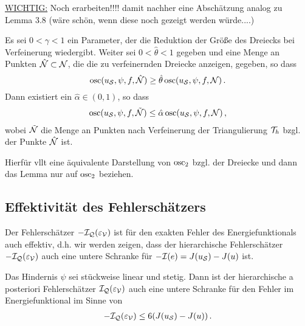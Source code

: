 \underline{WICHTIG:} Noch erarbeiten!!!! damit nachher eine Abschätzung analog zu \cite{MorNoc} Lemma 3.8 (wäre schön, wenn diese noch gezeigt werden würde....)


\begin{lemma}
Es sei $0 < \gamma < 1$ ein Parameter, der die Reduktion der Größe des Dreiecks bei Verfeinerung wiedergibt. Weiter sei $0 < \hat \theta < 1$ gegeben und eine Menge an Punkten $\hat{\mathcal N}\subset \mathcal N$, die die zu verfeinernden Dreiecke anzeigen, gegeben, so dass
\[
	\operatorname{osc}(u_{\mathcal S},\psi,f,\hat{\mathcal N}) \ge \hat\theta \operatorname{osc} (u_{\mathcal S},\psi,f,\mathcal N) \, .
\]
Dann existiert ein $\hat\alpha \in (0,1)$, so dass
\begin{align}
	\operatorname{osc}(u_{\mathcal S},\psi,f,\tilde{\mathcal N}) \le \hat \alpha \operatorname{osc} (u_{\mathcal S},\psi,f,\mathcal N) \, ,
\end{align}
wobei $\tilde{\mathcal N}$ die Menge an Punkten nach Verfeinerung der Triangulierung $\mathcal T_h$ bzgl. der Punkte $\hat{\mathcal N}$ ist.
\end{lemma}

Hierfür vllt eine äquivalente Darstellung von $\operatorname{osc}_2$ bzgl. der Dreiecke und dann das Lemma nur auf $\operatorname{osc}_2$ beziehen.








\subsection{Effektivität des Fehlerschätzers}
\label{kap:4.1.5}

Der Fehlerschätzer  $-\mathcal I_{\mathcal Q}(\varepsilon_{\mathcal V})$ ist für den exakten Fehler des Energiefunktionals auch effektiv, d.h. wir werden zeigen, dass der hierarchische Fehlerschätzer $-\mathcal I_{\mathcal Q}(\varepsilon_{\mathcal V})$ auch eine untere Schranke für $-\mathcal I(e) = J(u_{\mathcal S}) - J(u)$ ist.


\begin{theorem}\label{theorem:4.25}
Das Hindernis $\psi$ sei stückweise linear und stetig. Dann ist der hierarchische a posteriori Fehlerschätzer $\mathcal I_{\mathcal Q}(\varepsilon_{\mathcal V})$ auch eine untere Schranke für den Fehler im Energiefunktional im Sinne von
\begin{align}
	-\mathcal I_{\mathcal Q}(\varepsilon_{\mathcal V}) \le 6 (J(u_{\mathcal S})-J(u)) \, .
\end{align}
\end{theorem}

